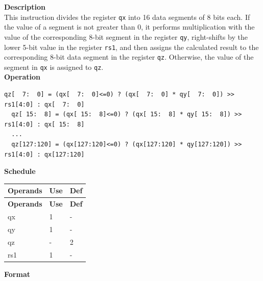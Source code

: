 \textbf{Description}\\
This instruction divides the register \lstinline{qx} into 16 data segments of 8 bits each. If the value of a segment is not greater than 0, it performs multiplication with the value of the corresponding 8-bit segment in the register \lstinline{qy}, right-shifts by the lower 5-bit value in the register \lstinline{rs1}, and then assigns the calculated result to the corresponding 8-bit data segment in the register \lstinline{qz}. Otherwise, the value of the segment in \lstinline{qx} is assigned to \lstinline{qz}.\\
\textbf{Operation}
\begin{lstlisting}[escapeinside=`?]
  qz[  7:  0] = (qx[  7:  0]<=0) ? (qx[  7:  0] * qy[  7:  0]) >> rs1[4:0] : qx[  7:  0]
  qz[ 15:  8] = (qx[ 15:  8]<=0) ? (qx[ 15:  8] * qy[ 15:  8]) >> rs1[4:0] : qx[ 15:  8]
  ...
  qz[127:120] = (qx[127:120]<=0) ? (qx[127:120] * qy[127:120]) >> rs1[4:0] : qx[127:120]
\end{lstlisting}


\textbf{Schedule}\\
\begin{longtable}[c]{|l|l|l|}
    \hline
    \rowcolor{lightgray}
    \textbf{Operands} & \textbf{Use} & \textbf{Def} \\\hline
    \endfirsthead
    \hline
    \rowcolor{lightgray}
     \textbf{Operands} & \textbf{Use} & \textbf{Def} \\\hline
    \endhead
    \hline
    \endfoot

    qx & 1 & - \\\hline
  qy & 1 & - \\\hline
     qz & - & 2 \\\hline
    rs1 & 1 & -

\end{longtable}

\textbf{Format}\\

